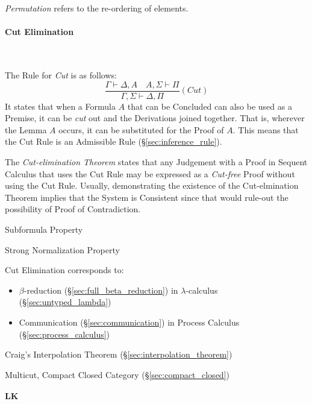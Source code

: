 \emph{Permutation} refers to the re-ordering of elements.



\paragraph{Cut Elimination}\label{sec:cut_elimination} \hfill \\\hfill

The Rule for \emph{Cut} is as follows:
\[
  \frac{
    \Gamma \vdash \Delta, A \quad A, \Sigma \vdash \Pi
  }{
    \Gamma, \Sigma \vdash \Delta, \Pi
  }(Cut)
\]
It states that when a Formula $A$ that can be Concluded can also be
used as a Premise, it can be \emph{cut} out and the Derivations joined
together. That is, wherever the Lemma $A$ occurs, it can be
substituted for the Proof of $A$. This means that the Cut Rule is an
Admissible Rule (\S\ref{sec:inference_rule}).

The \emph{Cut-elimination Theorem} states that any Judgement with a
Proof in Sequent Calculus that uses the Cut Rule may be expressed as a
\emph{Cut-free} Proof without using the Cut Rule. Usually,
demonstrating the existence of the Cut-elmination Theorem implies that
the System is Consistent since that would rule-out the possibility of
Proof of Contradiction.

Subformula Property %

Strong Normalization Property

Cut Elimination corresponds to:
\begin{itemize}
\item $\beta$-reduction (\S\ref{sec:full_beta_reduction}) in $\lambda$-calculus
  (\S\ref{sec:untyped_lambda})
\item Communication (\S\ref{sec:communication}) in Process Calculus
  (\S\ref{sec:process_calculus})
\end{itemize}

Craig's Interpolation Theorem (\S\ref{sec:interpolation_theorem})

Multicut, Compact Closed Category (\S\ref{sec:compact_closed})




\paragraph{$\mathbf{LK}$}\label{sec:lk} \hfill \\\hfill


